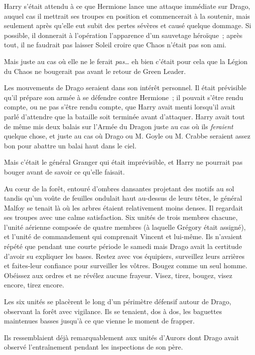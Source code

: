Harry s'était attendu à ce que Hermione lance une attaque immédiate sur Drago, auquel cas il mettrait ses troupes en position et commencerait à la soutenir, mais seulement après qu'elle eut subit des pertes sévères et causé quelque dommage. Si possible, il donnerait à l'opération l'apparence d'un sauvetage héroïque~; après tout, il ne faudrait pas laisser Soleil croire que Chaos n'était pas son ami.

Mais juste au cas où elle ne le ferait \emph{pas}… eh bien c'était pour cela que la Légion du Chaos ne bougerait pas avant le retour de Green Leader.

Les mouvements de Drago seraient dans son intérêt personnel. Il était prévisible qu'il prépare son armée à se défendre contre Hermione~; il pouvait s'être rendu compte, ou ne pas s'être rendu compte, que Harry avait menti lorsqu'il avait parlé d'attendre que la bataille soit terminée avant d'attaquer. Harry avait tout de même mis deux balais sur l'Armée du Dragon juste au cas où ils \emph{feraient} quelque chose, et juste au cas où Drago ou M. Goyle ou M. Crabbe seraient assez bon pour abattre un balai haut dans le ciel.

Mais c'était le général Granger qui était imprévisible, et Harry ne pourrait pas bouger avant de savoir ce qu'elle faisait.

\later

Au cœur de la forêt, entouré d'ombres dansantes projetant des motifs au sol tandis qu'un voûte de feuilles ondulait haut au-dessus de leurs têtes, le général Malfoy se tenait là où les arbres étaient relativement moins denses. Il regardait ses troupes avec une calme satisfaction. Six unités de trois membres chacune, l'unité aérienne composée de quatre membres (à laquelle Grégory était assigné), et l'unité de commandement qui comprenait Vincent et lui-même. Ils n'avaient répété que pendant une courte période le samedi mais Drago avait la certitude d'avoir su expliquer les bases. Restez avec vos équipiers, surveillez leurs arrières et faites-leur confiance pour surveiller les vôtres. Bougez comme un seul homme. Obéissez aux ordres et ne révélez aucune frayeur. Visez, tirez, bougez, visez encore, tirez encore.

Les six unités se placèrent le long d'un périmètre défensif autour de Drago, observant la forêt avec vigilance. Ils se tenaient, dos à dos, les baguettes maintenues basses jusqu'à ce que vienne le moment de frapper.

Ils ressemblaient déjà remarquablement aux unités d'Aurors dont Drago avait observé l'entraînement pendant les inspections de son père.

